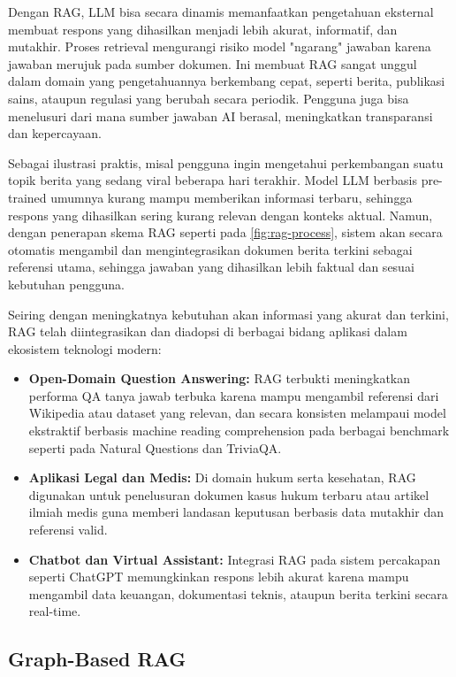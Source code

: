 Dengan RAG, LLM bisa secara dinamis memanfaatkan pengetahuan eksternal membuat respons yang dihasilkan menjadi lebih akurat, informatif, dan mutakhir. Proses retrieval mengurangi risiko model "ngarang" jawaban karena jawaban merujuk pada sumber dokumen. Ini membuat RAG sangat unggul dalam domain yang pengetahuannya berkembang cepat, seperti berita, publikasi sains, ataupun regulasi yang berubah secara periodik. Pengguna juga bisa menelusuri dari mana sumber jawaban AI berasal, meningkatkan transparansi dan kepercayaan.
		
Sebagai ilustrasi praktis, misal pengguna ingin mengetahui perkembangan suatu topik berita yang sedang viral beberapa hari terakhir. Model LLM berbasis pre-trained umumnya kurang mampu memberikan informasi terbaru, sehingga respons yang dihasilkan sering kurang relevan dengan konteks aktual. Namun, dengan penerapan skema RAG seperti pada \ref{fig:rag-process}, sistem akan secara otomatis mengambil dan mengintegrasikan dokumen berita terkini sebagai referensi utama, sehingga jawaban yang dihasilkan lebih faktual dan sesuai kebutuhan pengguna.
		
Seiring dengan meningkatnya kebutuhan akan informasi yang akurat dan terkini, RAG telah diintegrasikan dan diadopsi di berbagai bidang aplikasi dalam ekosistem teknologi modern:
\begin{itemize}
	\item \textbf{Open-Domain Question Answering:} RAG terbukti meningkatkan performa QA tanya jawab terbuka karena mampu mengambil referensi dari Wikipedia atau dataset yang relevan, dan secara konsisten melampaui model ekstraktif berbasis machine reading comprehension pada berbagai benchmark seperti pada Natural Questions dan TriviaQA.
	\item \textbf{Aplikasi Legal dan Medis:} Di domain hukum serta kesehatan, RAG digunakan untuk penelusuran dokumen kasus hukum terbaru atau artikel ilmiah medis guna memberi landasan keputusan berbasis data mutakhir dan referensi valid.
	\item \textbf{Chatbot dan Virtual Assistant:} Integrasi RAG pada sistem percakapan seperti ChatGPT memungkinkan respons lebih akurat karena mampu mengambil data keuangan, dokumentasi teknis, ataupun berita terkini secara real-time.
\end{itemize}

\subsection{Graph-Based RAG}

